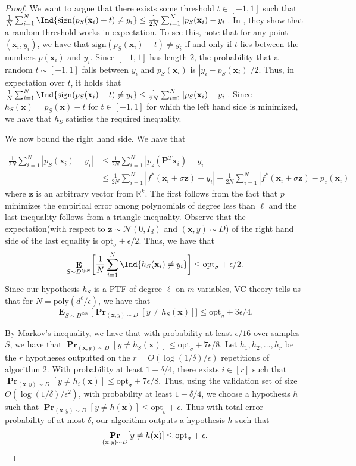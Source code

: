 \documentclass[10pt,a4paper]{article}
\renewcommand\vec[1]{\mathbf{#1}}
\DeclareMathOperator*{\pr}{\mathbf{Pr}}
\DeclareMathOperator*{\E}{\mathbf{E}}
\newcommand{\R}{\mathbb{R}}
\newcommand{\poly}{\mathrm{poly}}
\newcommand{\sign}{\mathrm{sign}}
\newcommand{\1}{\Ind}
\newcommand{\smoothopt}{\mathrm{opt}_{\sigma}}
\newcommand{\x}{\vec x}
\newcommand{\z}{\vec z}
\newcommand{\Gauss}{\mathcal{N}}
\newcommand{\Djoint}{D}
\begin{document}
\begin{proof}
    We want to argue that there exists some threshold $t\in [-1,1]$ such that 
    $\frac{1}{N}\sum_{i=1}^{N} \1\{\sign(p_S(\x_i)+t)\neq y_i\}\leq \frac{1}{2N}\sum_{i=1}^{N}|p_S(\x_i)-y_i|$. In \cite{KKMS:05}, they show that a random threshold works in expectation. To see this, note that for any point $(\x_i,y_i)$, we have that $\sign(p_S(\x_i)-t)\neq y_i$ if and only if $t$ lies between the numbers $p(\x_i)$ and $y_i$. Since $[-1,1]$ has length $2$, the probability that a random $t\sim [-1,1]$ falls between $y_i$ and $p_S(\x_i)$ is $|y_i-p_S(\x_i)|/2$. Thus, in expectation over $t$, it holds that $\frac{1}{N}\sum_{i=1}^{N} \1\{\sign(p_S(\x_i)-t)\neq y_i\}\leq \frac{1}{2N}\sum_{i=1}^{N}|p_S(\x_i)-y_i|$. Since $h_S(\x)=p_S(\x)-t$  for  $t\in[-1,1]$ for which the left hand side is minimized, we have that $h_S$ satisfies the required inequality.
    
      We now bound the right hand side. We have that
    
    \begin{align*}
    \frac{1}{2N}\sum_{i=1}^{N}|p_S(\x_i)-y_i|
    &\leq \frac{1}{2N}\sum_{i=1}^{N}|{p}_{z}(\vec P^T \x_i)-y_i|\\
    &\leq \frac{1}{2N}\sum_{i=1}^{N}|f^*(\x_i+\sigma \z)-y_i|+\frac{1}{2N}\sum_{i=1}^{N}|f^*(\x_i+\sigma\z)-{p}_z(\x_i)|
    \end{align*}
    where $\z$ is an arbitrary vector from $\R^{k}$. The first follows from the fact that $p$ minimizes the empirical error among polynomials of degree less than $\ell$ and the last inequality follows from a triangle inequality. Observe that the expectation(with respect to $\z\sim \Gauss(0,I_d)$ and $(\x,y)\sim D$) of the right hand side of the last equality is $\smoothopt+\epsilon/2$.  
    Thus, we have that 
\[
\E_{S\sim D^{\otimes N}}\biggl[\frac{1}{N}\sum_{i=1}^{N}\1\{h_S(\x_i)\neq y_i\}\biggr]\leq \smoothopt+\epsilon/2.
\] Since our hypothesis $h_S$ is a PTF of degree $\ell$ on $m$ variables, VC theory tells us that for $N=\poly(d^{\ell}/\epsilon)$, we have that 
\[
\E_{S\sim D^{\otimes N}}\biggl[\pr_{(\x, y) \sim \Djoint}[y\neq h_S(\x)]\biggr]\leq \smoothopt+3\epsilon/4.
\] 

By Markov's inequality, we have that with probability at least $\epsilon/16$ over samples $S$, we have that $\pr_{(\x, y) \sim \Djoint}[y\neq h_S(\x)]\leq \smoothopt+ 7\epsilon/8$. Let $h_1,h_2,\ldots, h_r$ be the $r$ hypotheses outputted on the $r=O(\log(1/\delta)/\epsilon)$ repetitions of algorithm $2$. With probability at least $1-\delta/4$, there exists $i\in [r]$ such that  $\pr_{(\x, y) \sim \Djoint}[y\neq h_i(\x)]\leq \smoothopt+ 7\epsilon/8$. Thus, using the validation set of size $O(\log(1/\delta)/\epsilon^2)$, with probability at least $1-\delta/4$, we choose a hypothesis $h$ such that $\pr_{(\x, y) \sim \Djoint}[y\neq h(\x)]\leq \smoothopt+ \epsilon$. Thus with total error probability of at most $\delta$, our algorithm outputs a hypothesis $h$ such that
\[
\pr_{(\x,y)\sim D}[y\neq h(\x)]\leq \smoothopt+\epsilon. \qedhere
\]
\end{proof}
\end{document}
